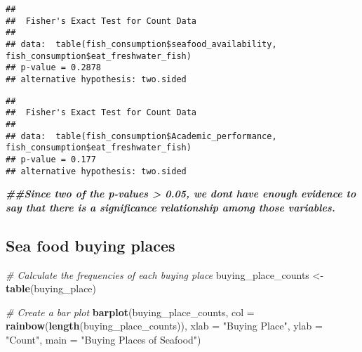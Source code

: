 \documentclass[
]{article}
\newenvironment{Shaded}{\begin{snugshade}}{\end{snugshade}}
\newcommand{\AttributeTok}[1]{\textcolor[rgb]{0.13,0.29,0.53}{#1}}
\newcommand{\CommentTok}[1]{\textcolor[rgb]{0.56,0.35,0.01}{\textit{#1}}}
\newcommand{\DocumentationTok}[1]{\textcolor[rgb]{0.56,0.35,0.01}{\textbf{\textit{#1}}}}
\newcommand{\FunctionTok}[1]{\textcolor[rgb]{0.13,0.29,0.53}{\textbf{#1}}}
\newcommand{\NormalTok}[1]{#1}
\newcommand{\OtherTok}[1]{\textcolor[rgb]{0.56,0.35,0.01}{#1}}
\newcommand{\SpecialCharTok}[1]{\textcolor[rgb]{0.81,0.36,0.00}{\textbf{#1}}}
\newcommand{\StringTok}[1]{\textcolor[rgb]{0.31,0.60,0.02}{#1}}
\begin{document}
\begin{verbatim}
## 
##  Fisher's Exact Test for Count Data
## 
## data:  table(fish_consumption$seafood_availability, fish_consumption$eat_freshwater_fish)
## p-value = 0.2878
## alternative hypothesis: two.sided
\end{verbatim}

\begin{Shaded}
\end{Shaded}

\begin{verbatim}
## 
##  Fisher's Exact Test for Count Data
## 
## data:  table(fish_consumption$Academic_performance, fish_consumption$eat_freshwater_fish)
## p-value = 0.177
## alternative hypothesis: two.sided
\end{verbatim}

\begin{Shaded}
\begin{Highlighting}[]
\DocumentationTok{\#\#Since two of the p{-}values \textgreater{} 0.05, we don\textquotesingle{}t have enough evidence to say that there is a significance relationship among those variables. }
\end{Highlighting}
\end{Shaded}

\hypertarget{sea-food-buying-places}{%
\subsection{Sea food buying places}\label{sea-food-buying-places}}

\begin{Shaded}
\begin{Highlighting}[]
\CommentTok{\# Calculate the frequencies of each buying place}
\NormalTok{buying\_place\_counts }\OtherTok{\textless{}{-}} \FunctionTok{table}\NormalTok{(buying\_place)}

\CommentTok{\# Create a bar plot}
\FunctionTok{barplot}\NormalTok{(buying\_place\_counts, }\AttributeTok{col =} \FunctionTok{rainbow}\NormalTok{(}\FunctionTok{length}\NormalTok{(buying\_place\_counts)), }
        \AttributeTok{xlab =} \StringTok{"Buying Place"}\NormalTok{, }\AttributeTok{ylab =} \StringTok{"Count"}\NormalTok{, }\AttributeTok{main =} \StringTok{"Buying Places of Seafood"}\NormalTok{)}
\end{Highlighting}
\end{Shaded}
\end{document}
